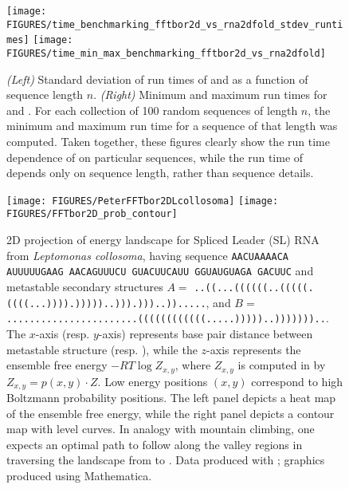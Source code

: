 \begin{figure}[!bpth]
\begin{center}
\texttt{[image: FIGURES/time\_benchmarking\_fftbor2d\_vs\_rna2dfold\_stdev\_runtimes]}
\texttt{[image: FIGURES/time\_min\_max\_benchmarking\_fftbor2d\_vs\_rna2dfold]}
\caption{\small
{\em (Left)}
Standard deviation of run times of \rnatwofold and \ffttwo
as a function of sequence length $n$.
{\em (Right)}
Minimum and maximum run times for \rnatwofold and \ffttwo.
For each collection of 100 random sequences of length $n$, the minimum
and maximum run time for a sequence of that length was computed.
Taken together, these figures clearly show the
run time dependence of \rnatwofold on particular sequences, while
the run time of \ffttwo depends only on sequence length, rather than
sequence details.
}
\end{center}
\label{fig:benchmarking3}
\end{figure}


\begin{figure}[!t]
\begin{center}
\texttt{[image: FIGURES/PeterFFTbor2DLcollosoma]}
\hskip 1cm
\texttt{[image: FIGURES/FFTbor2D\_prob\_contour]}
\caption{\small
2D projection of energy landscape for Spliced Leader (SL) RNA
from {\em Leptomonas collosoma}, having
sequence
{\tt AACUAAAACA AUUUUUGAAG AACAGUUUCU GUACUUCAUU GGUAUGUAGA GACUUC} and
metastable secondary structures  $A=$
{\tiny \tt ..((...((((((..(((((.((((...)))).)))))..))).)))..)).....}, and
$B=$ {\tiny \tt .......................((((((((((((.....)))))..)))))))..}.
The $x$-axis (resp. $y$-axis)
represents base pair distance between metastable structure \strA (resp. \strB),
while the $z$-axis represents the ensemble free energy $-RT \log Z_{x,y}$,
where $Z_{x,y}$ is computed in \ffttwo by $Z_{x,y}= p(x,y) \cdot Z$.
Low energy positions $(x,y)$ correspond to high Boltzmann probability positions.
The left panel depicts a heat map of the ensemble free energy,
while the right panel depicts a contour map with level curves. In analogy
with mountain climbing, one expects an optimal path to follow along the
valley regions in traversing the landscape from \strA to \strB. Data produced
with \ffttwo; graphics produced using Mathematica.
}
\label{fig:heatmapFFTbor2D}
\end{center}
\end{figure}





